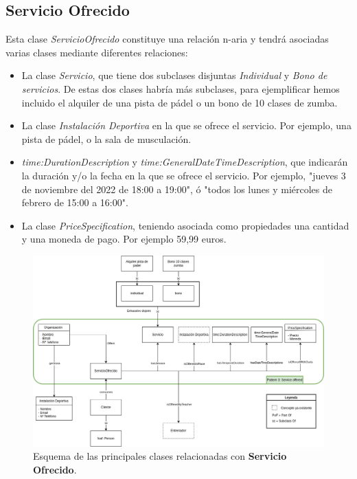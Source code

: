 \documentclass[a4paper,12pt]{article}
\begin{document}
	\subsection{Servicio Ofrecido}
	
	Esta clase \textit{ServicioOfrecido} constituye una relación n-aria y tendrá asociadas varias clases mediante diferentes relaciones:
	
	\begin{itemize}
		\item La clase \textit{Servicio}, que tiene dos subclases disjuntas \textit{Individual} y \textit{Bono de servicios}. De estas dos clases habría más subclases, para ejemplificar hemos incluido el alquiler de una pista de pádel o un bono de 10 clases de zumba.
		\item La clase \textit{Instalación Deportiva} en la que se ofrece el servicio. Por ejemplo, una pista de pádel, o la sala de musculación.
		\item \textit{time:DurationDescription} y \textit{time:GeneralDateTimeDescription}, que indicarán la duración y/o la fecha en la que se ofrece el servicio. Por ejemplo, "jueves 3 de noviembre del 2022 de 18:00 a 19:00", ó "todos los lunes y miércoles de febrero de 15:00 a 16:00".
		\item La clase \textit{PriceSpecification}, teniendo asociada como propiedades una cantidad y una moneda de pago. Por ejemplo 59,99 euros.
	\end{itemize}
	
	\begin{figure}[H]
		\centering
		\includegraphics[width=\textwidth]{include/servicio.png}
		\caption{Esquema de las principales clases relacionadas con \textbf{Servicio Ofrecido}.}
	\end{figure}
	
\end{document}
